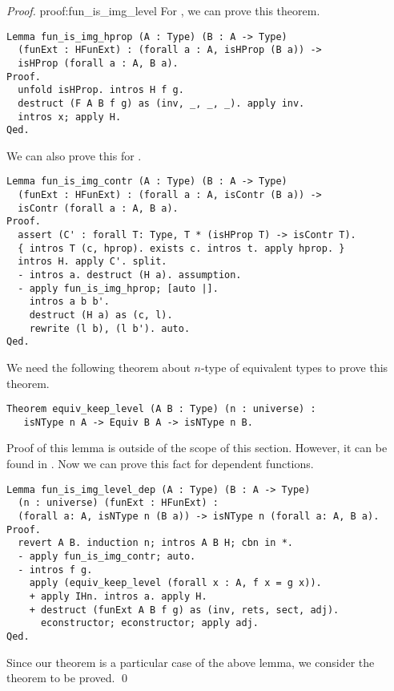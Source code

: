 \begin{proof}{}{proof:fun_is_img_level}
For , we can prove this theorem.
\begin{verbatim}
Lemma fun_is_img_hprop (A : Type) (B : A -> Type) 
  (funExt : HFunExt) : (forall a : A, isHProp (B a)) -> 
  isHProp (forall a : A, B a).
Proof.
  unfold isHProp. intros H f g. 
  destruct (F A B f g) as (inv, _, _, _). apply inv. 
  intros x; apply H.
Qed.
\end{verbatim} 
We can also prove this for .
\begin{verbatim}
Lemma fun_is_img_contr (A : Type) (B : A -> Type) 
  (funExt : HFunExt) : (forall a : A, isContr (B a)) -> 
  isContr (forall a : A, B a).
Proof.
  assert (C' : forall T: Type, T * (isHProp T) -> isContr T).
  { intros T (c, hprop). exists c. intros t. apply hprop. }
  intros H. apply C'. split.
  - intros a. destruct (H a). assumption.
  - apply fun_is_img_hprop; [auto |].
    intros a b b'.
    destruct (H a) as (c, l).
    rewrite (l b), (l b'). auto. 
Qed. 
\end{verbatim} 
We need the following theorem about $n$-type of equivalent types to prove this theorem. 
\begin{verbatim}
Theorem equiv_keep_level (A B : Type) (n : universe) :
   isNType n A -> Equiv B A -> isNType n B.
\end{verbatim} 
Proof of this lemma is outside of the scope of this section. However, it can be found in . Now we can prove this fact for dependent functions.
\begin{verbatim}
Lemma fun_is_img_level_dep (A : Type) (B : A -> Type) 
  (n : universe) (funExt : HFunExt) : 
  (forall a: A, isNType n (B a)) -> isNType n (forall a: A, B a).
Proof.
  revert A B. induction n; intros A B H; cbn in *.
  - apply fun_is_img_contr; auto.
  - intros f g. 
    apply (equiv_keep_level (forall x : A, f x = g x)).
    + apply IHn. intros a. apply H.
    + destruct (funExt A B f g) as (inv, rets, sect, adj).
      econstructor; econstructor; apply adj.
Qed.
\end{verbatim}
Since our theorem is a particular case of the above lemma, we consider the theorem to be proved. \qed
\end{proof}
